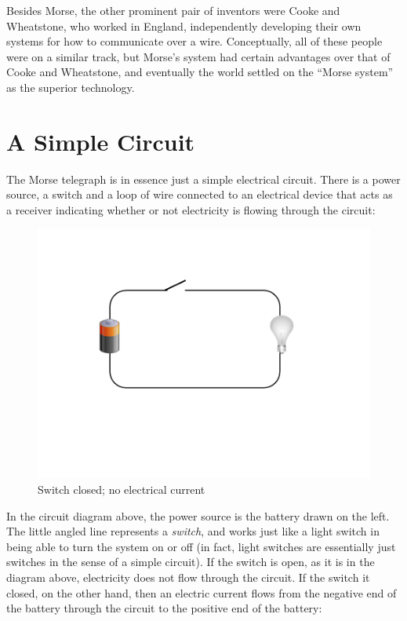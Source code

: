 \documentclass[UTF8]{book}
\begin{document}
\begin{CJK}{UTF8}{gbsn}
Besides Morse, the other prominent pair of inventors were Cooke and Wheatstone, who worked in England, independently developing their own systems for how to communicate over a wire. Conceptually, all of these people were on a similar track, but Morse's system had certain advantages over that of Cooke and Wheatstone, and eventually the world settled on the ``Morse system'' as the superior technology.

\section{A Simple Circuit}

The Morse telegraph is in essence just a simple electrical circuit. There is a power source, a switch and a loop of wire connected to an electrical device that acts as a receiver indicating whether or not electricity is flowing through the circuit:

\begin{figure}[H]
\centering
\includegraphics[width=0.8\linewidth]{circuit1}
\caption{Switch closed; no electrical current}
\end{figure}

In the circuit diagram above, the power source is the battery drawn on the left. The little angled line represents a \emph{switch}, and works just like a light switch in being able to turn the system on or off (in fact, light switches are essentially just switches in the sense of a simple circuit). If the switch is open, as it is in the diagram above, electricity does not flow through the circuit. If the switch it closed, on the other hand, then an electric current flows from the negative end of the battery through the circuit to the positive end of the battery:


\end{CJK}
\end{document}
